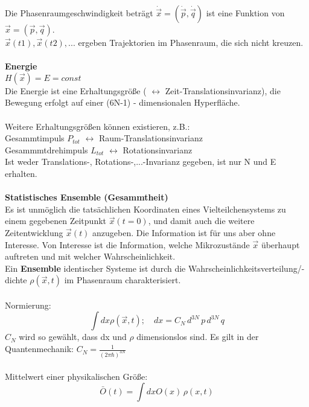 \documentclass[a4paper,11pt]{scrartcl}
\begin{document}
Die Phasenraumgeschwindigkeit beträgt $ \dot{\vec{x}} = (\dot{\vec{p}}, \dot{\vec{q}})$  ist eine Funktion von $\vec{x} = (\vec{p}, \vec{q})$.\\
$\vec{x}(t1), \vec{x}(t2), ...$ ergeben Trajektorien im Phasenraum, die sich nicht kreuzen.\\
\\
\textbf{Energie}\\
$H(\vec{x}) = E = const$ \\
Die Energie ist eine Erhaltungsgröße ( $\leftrightarrow$ Zeit-Translationsinvarianz), die Bewegung erfolgt auf einer (6N-1) - dimensionalen Hyperfläche.\\
\\
Weitere Erhaltungsgrößen können existieren, z.B.:\\
Gesammtimpuls $P_{tot}$ $\leftrightarrow$ Raum-Translationsinvarianz\\
Gesammmtdrehimpuls $L_{tot}$ $\leftrightarrow$ Rotationsinvarianz\\
Ist weder Translations-, Rotations-,...-Invarianz gegeben, ist nur N und E erhalten.\\
\\
\textbf{Statistisches Ensemble (Gesammtheit)}\\
Es ist unmöglich die tatsächlichen Koordinaten eines Vielteilchensystems zu einem gegebenen Zeitpunkt $\vec{x}(t= 0)$, und damit auch die weitere Zeitentwicklung $\vec{x}(t)$ anzugeben. Die Information ist für uns aber ohne Interesse. Von Interesse ist die Information, welche Mikrozustände $\vec{x}$ überhaupt auftreten und mit welcher Wahrscheinlichkeit.\\
Ein \textbf{Ensemble} identischer Systeme ist durch die Wahrscheinlichkeitsverteilung/-dichte $\rho (\vec{x},t)$ im Phasenraum charakterisiert.\\
\\
Normierung: 
\begin{equation}
 \int dx \rho(\vec{x},t); \,\,\,\,\,\, dx = C_N \, d^{3N}\, p \, d^{3N}\,q
\end{equation}
$C_N$ wird so gewählt, dass dx und $\rho$ dimensionslos sind. Es gilt in der Quantenmechanik: $C_N = \frac{1}{(2 \pi \hbar)^{3N}}$\\
\\
Mittelwert einer physikalischen Größe:
\begin{equation}
 \bar{O}(t) = \int dx O(x)\, \rho(x,t)
\end{equation}
\end{document}
